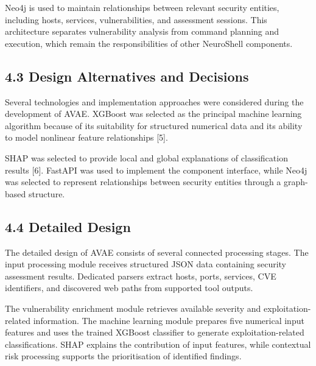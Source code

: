 \documentclass[
]{article}
\begin{document}
Neo4j is used to maintain relationships between relevant security
entities, including hosts, services, vulnerabilities, and assessment
sessions. This architecture separates vulnerability analysis from
command planning and execution, which remain the responsibilities of
other NeuroShell components.

\hypertarget{design-alternatives-and-decisions}{%
\subsection{4.3 Design Alternatives and
Decisions}\label{design-alternatives-and-decisions}}

Several technologies and implementation approaches were considered
during the development of AVAE. XGBoost was selected as the principal
machine learning algorithm because of its suitability for structured
numerical data and its ability to model nonlinear feature relationships
{[}5{]}.

SHAP was selected to provide local and global explanations of
classification results {[}6{]}. FastAPI was used to implement the
component interface, while Neo4j was selected to represent relationships
between security entities through a graph-based structure.

\hypertarget{detailed-design}{%
\subsection{4.4 Detailed Design}\label{detailed-design}}

The detailed design of AVAE consists of several connected processing
stages. The input processing module receives structured JSON data
containing security assessment results. Dedicated parsers extract hosts,
ports, services, CVE identifiers, and discovered web paths from
supported tool outputs.

The vulnerability enrichment module retrieves available severity and
exploitation-related information. The machine learning module prepares
five numerical input features and uses the trained XGBoost classifier to
generate exploitation-related classifications. SHAP explains the
contribution of input features, while contextual risk processing
supports the prioritisation of identified findings.
\end{document}
